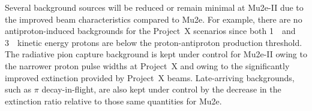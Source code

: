 

Several background sources will be reduced or remain minimal at
Mu2e-II due to the improved beam characteristics compared to Mu2e.
For example, there are no antiproton-induced backgrounds for the
Project~X scenarios since both 1~\gev\ and 3~\gev\ kinetic energy
protons are below the proton-antiproton production threshold.  The
radiative pion capture background is kept under control for Mu2e-II
owing to the narrower proton pulse widths at Project~X and owing to
the significantly improved extinction provided by Project~X beams.
Late-arriving backgrounds, such as $\pi$ decay-in-flight, are also
kept under control by the decrease in the extinction ratio relative to
those same quantities for Mu2e.
   
